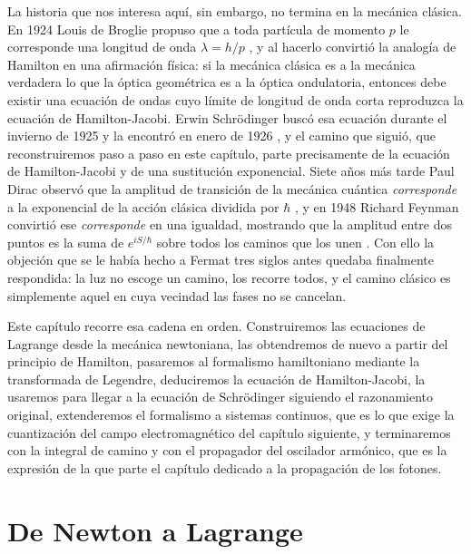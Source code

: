     La historia que nos interesa aquí, sin embargo, no termina en la mecánica clásica. En 1924 Louis de Broglie propuso que a toda partícula de momento $p$ le corresponde una longitud de onda $\lambda = h/p$ \citep{debroglie1924recherches}, y al hacerlo convirtió la analogía de Hamilton en una afirmación física: si la mecánica clásica es a la mecánica verdadera lo que la óptica geométrica es a la óptica ondulatoria, entonces debe existir una ecuación de ondas cuyo límite de longitud de onda corta reproduzca la ecuación de Hamilton-Jacobi. Erwin Schrödinger buscó esa ecuación durante el invierno de 1925 y la encontró en enero de 1926 \citep{schrodinger1926quantisierung}, y el camino que siguió, que reconstruiremos paso a paso en este capítulo, parte precisamente de la ecuación de Hamilton-Jacobi y de una sustitución exponencial. Siete años más tarde Paul Dirac observó que la amplitud de transición de la mecánica cuántica \textit{corresponde} a la exponencial de la acción clásica dividida por $\hbar$ \citep{dirac1933lagrangian}, y en 1948 Richard Feynman convirtió ese \textit{corresponde} en una igualdad, mostrando que la amplitud entre dos puntos es la suma de $e^{iS/\hbar}$ sobre todos los caminos que los unen \citep{feynman1948space}. Con ello la objeción que se le había hecho a Fermat tres siglos antes quedaba finalmente respondida: la luz no escoge un camino, los recorre todos, y el camino clásico es simplemente aquel en cuya vecindad las fases no se cancelan.

    Este capítulo recorre esa cadena en orden. Construiremos las ecuaciones de Lagrange desde la mecánica newtoniana, las obtendremos de nuevo a partir del principio de Hamilton, pasaremos al formalismo hamiltoniano mediante la transformada de Legendre, deduciremos la ecuación de Hamilton-Jacobi, la usaremos para llegar a la ecuación de Schrödinger siguiendo el razonamiento original, extenderemos el formalismo a sistemas continuos, que es lo que exige la cuantización del campo electromagnético del capítulo siguiente, y terminaremos con la integral de camino y con el propagador del oscilador armónico, que es la expresión de la que parte el capítulo dedicado a la propagación de los fotones.

\section{De Newton a Lagrange}

